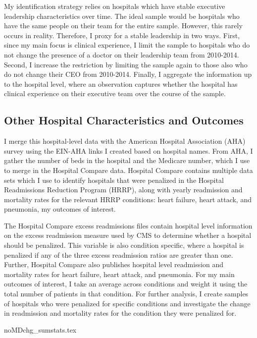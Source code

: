 \documentclass[12pt]{article}
\begin{document}
    My identification strategy relies on hospitals which have stable executive leadership characteristics over time. The ideal sample would be hospitals who have the same people on their team for the entire sample. However, this rarely occurs in reality. Therefore, I proxy for a stable leadership in two ways. First, since my main focus is clinical experience, I limit the sample to hospitals who do not change the presence of a doctor on their leadership team from 2010-2014. Second, I increase the restriction by limiting the sample again to those also who do not change their CEO from 2010-2014. Finally, I aggregate the information up to the hospital level, where an observation captures whether the hospital has clinical experience on their executive team over the course of the sample. 


    \subsection{Other Hospital Characteristics and Outcomes}

    I merge this hospital-level data with the American Hospital Association (AHA) survey using the EIN-AHA links I created based on hospital names. From AHA, I gather the number of beds in the hospital and the Medicare number, which I use to merge in the Hospital Compare data. Hospital Compare contains multiple data sets which I use to identify hospitals that were penalized in the Hospital Readmissions Reduction Program (HRRP), along with yearly readmission and mortality rates for the relevant HRRP conditions: heart failure, heart attack, and pneumonia, my outcomes of interest.

    The Hospital Compare excess readmissions files contain hospital level information on the excess readmission measure used by CMS to determine whether a hospital should be penalized. This variable is also condition specific, where a hospital is penalized if any of the three excess readmission ratios are greater than one. Further, Hospital Compare also publishes hospital level readmission and mortality rates for heart failure, heart attack, and pneumonia. For my main outcomes of interest, I take an average across conditions and weight it using the total number of patients in that condition. For further analysis, I create samples of hospitals who were penalized for specific conditions and investigate the change in readmission and mortality rates for the condition they were penalized for. 

    {noMDchg_sumstats.tex}
\end{document}
